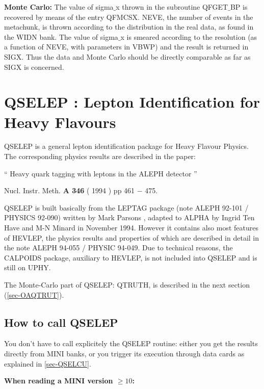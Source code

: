 {\bf Monte Carlo: }
The value of sigma$\_$x thrown in the subroutine QFGET$\_$BP is recovered by means of
the entry QFMCSX.  NEVE, the number of events in the metachunk,
is thrown according to the distribution in the real data, as found
in the WIDN bank.  The value of sigma$\_$x is smeared according to
the resolution (as a function of NEVE, with parameters in VBWP)
and the result is returned in SIGX.  Thus the data and Monte Carlo
should be directly comparable as far as SIGX is concerned.
 
\par
\section{\label{sec-OAQSELE}QSELEP : Lepton Identification for Heavy Flavours}
\par
 
      QSELEP is a general lepton identification package
      for Heavy Flavour Physics.
      The corresponding physics results are described in the paper:
 
      `` Heavy quark tagging with leptons in the ALEPH detector ''
 
      Nucl. Instr. Meth. {\bf A 346} ( 1994 ) pp 461 $-$ 475.
 
 
      QSELEP is built basically from the LEPTAG package    (note ALEPH 92-101 / PHYSICS 92-090)
      written by Mark Parsons ,
      adapted to ALPHA by Ingrid Ten Have and M-N Minard in November 1994. However it contains also
      most features of HEVLEP, the physics results and properties of which are described in detail in the note
      ALEPH 94-055 / PHYSIC 94-049. Due to technical reasons, the CALPOIDS package, auxiliary to HEVLEP,
      is not included into QSELEP and is still on UPHY.
 
      The Monte-Carlo part of QSELEP: QTRUTH,  is described in the next section (\ref{sec-OAQTRUT}).
 
\subsection{\label{sec-QSELCA}How to call QSELEP}
\par
         You don't have to call explicitely the QSELEP routine: either you
         get the results directly from MINI banks, or you trigger its execution
         through data cards as explained in \ref{sec-QSELCU}.
 
{\bf When reading a MINI version $\geq 10$:}
 
